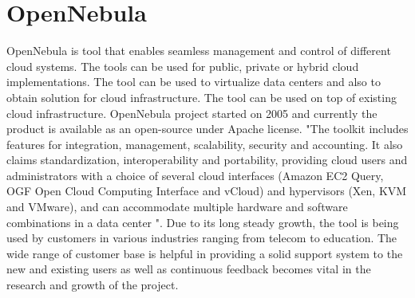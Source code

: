 \section{OpenNebula}

OpenNebula is tool that enables seamless management and control of different cloud systems.
The tools can be used for public, private or hybrid cloud implementations.
The tool can be used to virtualize data centers and also to obtain solution for cloud infrastructure.
The tool can be used on top of existing cloud infrastructure.
OpenNebula project started on 2005 and currently the product is available as an open-source under Apache license.
"The toolkit includes features for integration, management, scalability, security and accounting.
It also claims standardization, interoperability and portability, providing cloud users and administrators with a choice of several
cloud interfaces (Amazon EC2 Query, OGF Open Cloud Computing Interface and vCloud) and hypervisors
(Xen, KVM and VMware), and can accommodate multiple hardware and software combinations in a data center \cite{hid-sp18-417-opennebula-wiki}".
Due to its long steady growth, the tool is being used by customers in various industries ranging from telecom to education.
The wide range of customer base is helpful in providing a solid support system to the new and existing users as well as continuous
feedback becomes vital in the research and growth of the project. 
